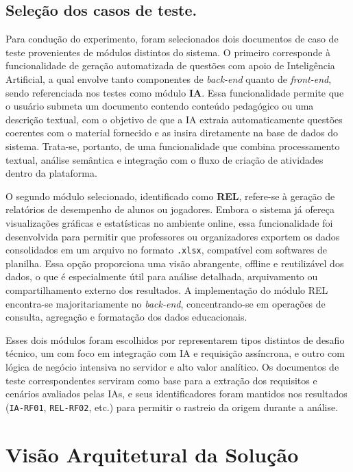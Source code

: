 \begin{enumerate}
\end{enumerate}

\subsection{Seleção dos casos de teste.}
Para condução do experimento, foram selecionados dois documentos de caso de teste provenientes de módulos distintos do sistema. O primeiro corresponde à funcionalidade de geração automatizada de questões com apoio de Inteligência Artificial, a qual envolve tanto componentes de \textit{back-end} quanto de \textit{front-end}, sendo referenciada nos testes como módulo \textbf{IA}. Essa funcionalidade permite que o usuário submeta um documento contendo conteúdo pedagógico ou uma descrição textual, com o objetivo de que a IA extraia automaticamente questões coerentes com o material fornecido e as insira diretamente na base de dados do sistema. Trata-se, portanto, de uma funcionalidade que combina processamento textual, análise semântica e integração com o fluxo de criação de atividades dentro da plataforma.

O segundo módulo selecionado, identificado como \textbf{REL}, refere-se à geração de relatórios de desempenho de alunos ou jogadores. Embora o sistema já ofereça visualizações gráficas e estatísticas no ambiente online, essa funcionalidade foi desenvolvida para permitir que professores ou organizadores exportem os dados consolidados em um arquivo no formato \texttt{.xlsx}, compatível com softwares de planilha. Essa opção proporciona uma visão abrangente, offline e reutilizável dos dados, o que é especialmente útil para análise detalhada, arquivamento ou compartilhamento externo dos resultados. A implementação do módulo REL encontra-se majoritariamente no \textit{back-end}, concentrando-se em operações de consulta, agregação e formatação dos dados educacionais.

Esses dois módulos foram escolhidos por representarem tipos distintos de desafio técnico, um com foco em integração com IA e requisição assíncrona, e outro com lógica de negócio intensiva no servidor e alto valor analítico. Os documentos de teste correspondentes serviram como base para a extração dos requisitos e cenários avaliados pelas IAs, e seus identificadores foram mantidos nos resultados (\texttt{IA-RF01}, \texttt{REL-RF02}, etc.) para permitir o rastreio da origem durante a análise.

\section{Visão Arquitetural da Solução}

